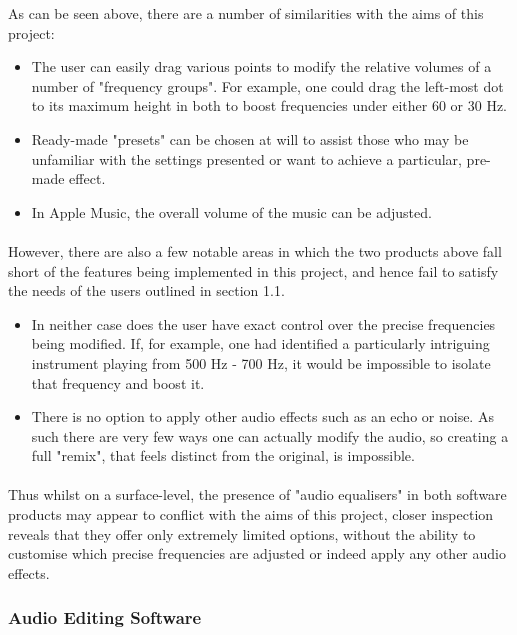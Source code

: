 \documentclass{article}
\begin{document}
	As can be seen above, there are a number of similarities with the aims of this project:
	\begin{itemize}
		\item The user can easily drag various points  to modify the relative volumes of a number of "frequency groups". For example, one could drag the left-most dot to its maximum height in both to boost frequencies under either 60 or 30 Hz.
		\item Ready-made "presets" can be chosen at will to assist those who may be unfamiliar with the settings presented or want to achieve a particular, pre-made effect.
		\item In Apple Music, the overall volume of the music can be adjusted.
	\end{itemize}
	
	\paragraph{}
	However, there are also a few notable areas in which the two products above fall short of the features being implemented in this project, and hence fail to satisfy the needs of the users outlined in section 1.1.
	\begin{itemize}
		\item In neither case does the user have exact control over the precise frequencies being modified.  If, for example, one had identified a particularly intriguing instrument playing from 500 Hz - 700 Hz, it would be impossible to isolate that frequency and boost it.
		\item There is no option to apply other audio effects such as an echo or noise. As such there are very few ways one can actually modify the audio, so creating a full "remix", that feels distinct from the original, is impossible.
	\end{itemize}

	\paragraph{}
	Thus whilst on a surface-level, the presence of "audio equalisers" in both software products may appear to conflict with the aims of this project, closer inspection reveals that they offer only extremely limited options, without the ability to customise which precise frequencies are adjusted or indeed apply any other audio effects.

	\subsubsection{Audio Editing Software}
\end{document}
